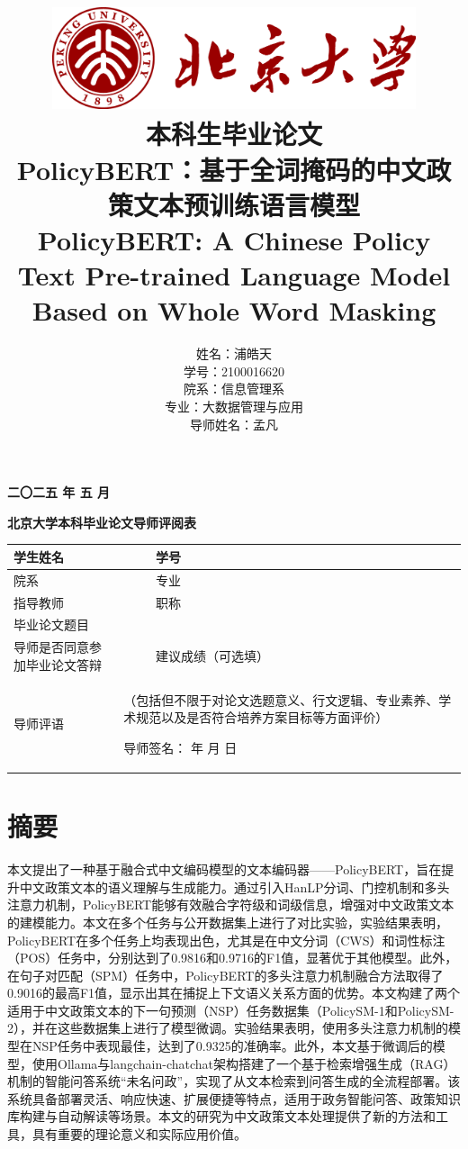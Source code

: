 \documentclass[12pt, a4paper]{ctexart}
\title{
    \includegraphics[width=0.8\textwidth]{./images/logo.png} \\[1em] %
    {\fontsize{40pt}{24pt}\selectfont \textbf{本科生毕业论文}} \\[2em] %
    \textbf{PolicyBERT：基于全词掩码的中文政策文本预训练语言模型} \\[1em]
    PolicyBERT: A Chinese Policy Text Pre-trained Language Model Based on Whole Word Masking  \\[3em] %
}
\author{姓名：浦皓天 \\
学号：2100016620 \\
院系：信息管理系 \\
专业：大数据管理与应用 \\
导师姓名：孟凡}
\date{}
\begin{document}
\maketitle
\vfill
\begin{center}
    \textbf{二〇二五 年 五 月} \\[1em] %
\end{center}

\newpage
\begin{center}
    \textbf{\LARGE 北京大学本科毕业论文导师评阅表}
\end{center}

\vspace{1em}

\renewcommand{\arraystretch}{1.5} %
\begin{tabularx}{0.87\textwidth}{|X|X|X|X|}
    \hline
    学生姓名 &   & 学号 &  \\
    \hline
    院系 &   & 专业 &  \\
    \hline
    指导教师 &    & 职称 & \\
    \hline
    毕业论文题目 & \multicolumn{3}{l|}{} \\
    \hline
    导师是否同意参加毕业论文答辩 & &建议成绩（可选填） & \\
    \hline
    \vspace{3cm} 导师评语 \newline \rule{0pt}{10cm} & \multicolumn{3}{|p{0.6\textwidth}|}{（包括但不限于对论文选题意义、行文逻辑、专业素养、学术规范以及是否符合培养方案目标等方面评价）\newline \rule{0pt}{12cm} \vfill  导师签名：\hspace{2.5cm} \underline{\hspace{1.5cm}} 年 \underline{\hspace{0.5cm}} 月 \underline{\hspace{0.5cm}} 日} \\ 
    \hline
\end{tabularx}

\newpage
\section*{摘要}
本文提出了一种基于融合式中文编码模型的文本编码器——PolicyBERT，旨在提升中文政策文本的语义理解与生成能力。通过引入HanLP分词、门控机制和多头注意力机制，PolicyBERT能够有效融合字符级和词级信息，增强对中文政策文本的建模能力。本文在多个任务与公开数据集上进行了对比实验，实验结果表明，PolicyBERT在多个任务上均表现出色，尤其是在中文分词（CWS）和词性标注（POS）任务中，分别达到了0.9816和0.9716的F1值，显著优于其他模型。此外，在句子对匹配（SPM）任务中，PolicyBERT的多头注意力机制融合方法取得了0.9016的最高F1值，显示出其在捕捉上下文语义关系方面的优势。本文构建了两个适用于中文政策文本的下一句预测（NSP）任务数据集（PolicySM-1和PolicySM-2），并在这些数据集上进行了模型微调。实验结果表明，使用多头注意力机制的模型在NSP任务中表现最佳，达到了0.9325的准确率。此外，本文基于微调后的模型，使用Ollama与langchain-chatchat架构搭建了一个基于检索增强生成（RAG）机制的智能问答系统“未名问政”，实现了从文本检索到问答生成的全流程部署。该系统具备部署灵活、响应快速、扩展便捷等特点，适用于政务智能问答、政策知识库构建与自动解读等场景。本文的研究为中文政策文本处理提供了新的方法和工具，具有重要的理论意义和实际应用价值。
\end{document}
